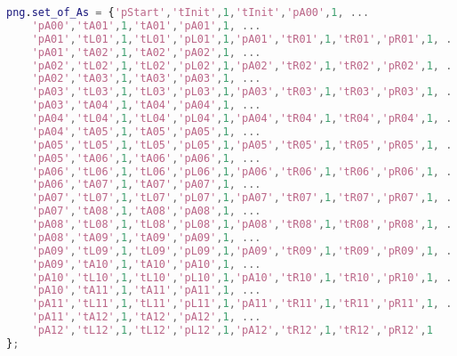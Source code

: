 \begin{lstlisting}[language=MATLAB, caption=wilma\_pn\_pdf.m]
% Arcs ordered row by row with a new line for the aisle and for the sides
png.set_of_As = {'pStart','tInit',1,'tInit','pA00',1, ...
    'pA00','tA01',1,'tA01','pA01',1, ...
    'pA01','tL01',1,'tL01','pL01',1,'pA01','tR01',1,'tR01','pR01',1, ...
    'pA01','tA02',1,'tA02','pA02',1, ...
    'pA02','tL02',1,'tL02','pL02',1,'pA02','tR02',1,'tR02','pR02',1, ...
    'pA02','tA03',1,'tA03','pA03',1, ...
    'pA03','tL03',1,'tL03','pL03',1,'pA03','tR03',1,'tR03','pR03',1, ...
    'pA03','tA04',1,'tA04','pA04',1, ...
    'pA04','tL04',1,'tL04','pL04',1,'pA04','tR04',1,'tR04','pR04',1, ...
    'pA04','tA05',1,'tA05','pA05',1, ...
    'pA05','tL05',1,'tL05','pL05',1,'pA05','tR05',1,'tR05','pR05',1, ...
    'pA05','tA06',1,'tA06','pA06',1, ...
    'pA06','tL06',1,'tL06','pL06',1,'pA06','tR06',1,'tR06','pR06',1, ...
    'pA06','tA07',1,'tA07','pA07',1, ...
    'pA07','tL07',1,'tL07','pL07',1,'pA07','tR07',1,'tR07','pR07',1, ...
    'pA07','tA08',1,'tA08','pA08',1, ...
    'pA08','tL08',1,'tL08','pL08',1,'pA08','tR08',1,'tR08','pR08',1, ...
    'pA08','tA09',1,'tA09','pA09',1, ...
    'pA09','tL09',1,'tL09','pL09',1,'pA09','tR09',1,'tR09','pR09',1, ...
    'pA09','tA10',1,'tA10','pA10',1, ...
    'pA10','tL10',1,'tL10','pL10',1,'pA10','tR10',1,'tR10','pR10',1, ...
    'pA10','tA11',1,'tA11','pA11',1, ...
    'pA11','tL11',1,'tL11','pL11',1,'pA11','tR11',1,'tR11','pR11',1, ...
    'pA11','tA12',1,'tA12','pA12',1, ...
    'pA12','tL12',1,'tL12','pL12',1,'pA12','tR12',1,'tR12','pR12',1
};
\end{lstlisting}


